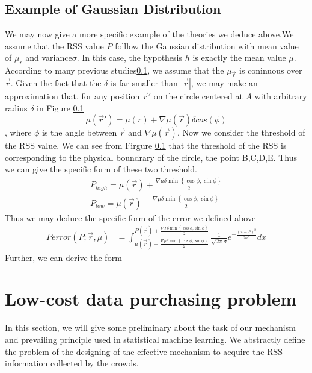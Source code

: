 \documentclass[10pt,conference,compsocconf,letterpaper]{IEEEtran}
\begin{document}
\subsection{Example of Gaussian Distribution}
We may now give a more specific example of the theories we deduce above.We assume that the RSS value $P$ folllow the Gaussian distribution with mean value of $\mu_{r}$ and variance$\sigma$. In this case, the hypothesis $h$ is exactly the mean value $\mu$. According to many previous studies\ref{}, we assume that the $\mu_{\vec r}$ is coninuous over $\vec r$. Given the fact that the $\delta$ is far smaller than $|\vec r|$, we may make an approximation that, for any position $\vec r'$ on the circle centered at $A$ with arbitrary radius $\delta$ in Figure \ref{}
\begin{equation}
\mu(\vec r')=\mu(r)+\nabla \mu(\vec r)\delta cos(\phi)
\end{equation}
, where $\phi$ is the angle between $\vec r$ and $\nabla \mu(\vec r)$. Now we consider the threshold of the RSS value. We can see from Firgure \ref{} that the threshold of the RSS is corresponding to the physical boundrary of the circle, the point B,C,D,E. Thus we can give the specific form of these two threshold.
\begin{equation}
\begin{aligned}
{P_{high}} = \mu (\vec r) + \frac{{\nabla\mu\delta \min \left\{ {\cos \phi ,\sin \phi } \right\}}}{2}\\
{P_{low}} = \mu (\vec r) - \frac{{\nabla\mu\delta \min \left\{ {\cos \phi ,\sin \phi } \right\}}}{2}
\end{aligned}
\end{equation}
Thus we may deduce the specific form of the error we defined above
\begin{equation}
\begin{aligned}
Perror(P;\vec r,\mu) &=\int_{ \mu (\vec r) + \frac{{\nabla\mu\delta \min \left\{ {\cos \phi ,\sin \phi } \right\}}}{2}}^{P (\vec r) + \frac{{\nabla P \delta \min \left\{ {\cos \phi ,\sin \phi } \right\}}}{2}}\frac{1}{\sqrt{2\pi}\sigma}e^{-\frac{(x-P)^2}{2\sigma^2}}dx
\end{aligned}
\end{equation}
Further, we can derive the form 

\section{Low-cost data purchasing problem}\label{probdef}
In this section, we will give some preliminary about the task of our mechanism and prevailing principle used in statistical machine learning. We abstractly define the problem of the designing of the effective mechanism to acquire the RSS information collected by the crowds. 
\end{document}
